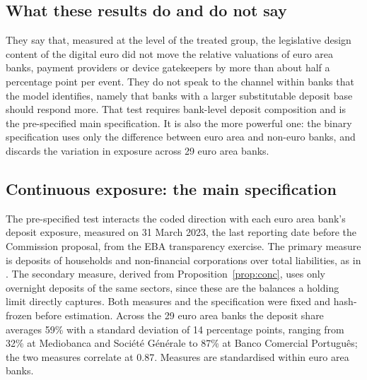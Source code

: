 \documentclass[11pt]{article}
\theoremstyle{plain}\newtheorem{proposition}{Proposition}
\begin{document}
\subsection{What these results do and do not say}

They say that, measured at the level of the treated group, the legislative design content of the digital euro did not move the relative valuations of euro area banks, payment providers or device gatekeepers by more than about half a percentage point per event. They do not speak to the channel within banks that the model identifies, namely that banks with a larger substitutable deposit base should respond more. That test requires bank-level deposit composition and is the pre-specified main specification. It is also the more powerful one: the binary specification uses only the difference between euro area and non-euro banks, and discards the variation in exposure across 29 euro area banks.

\subsection{Continuous exposure: the main specification}\label{sec:continuous}

The pre-specified test interacts the coded direction with each euro area bank's deposit exposure, measured on 31 March 2023, the last reporting date before the Commission proposal, from the EBA transparency exercise. The primary measure is deposits of households and non-financial corporations over total liabilities, as in \citet{burlon2024}. The secondary measure, derived from Proposition~\ref{prop:conc}, uses only overnight deposits of the same sectors, since these are the balances a holding limit directly captures. Both measures and the specification were fixed and hash-frozen before estimation. Across the 29 euro area banks the deposit share averages 59\% with a standard deviation of 14 percentage points, ranging from 32\% at Mediobanca and Société Générale to 87\% at Banco Comercial Português; the two measures correlate at 0.87. Measures are standardised within euro area banks.
\end{document}
